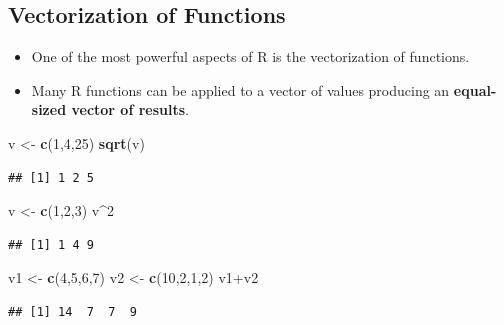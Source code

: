 \documentclass[]{book}
\newenvironment{Shaded}{\begin{snugshade}}{\end{snugshade}}
\newcommand{\KeywordTok}[1]{\textcolor[rgb]{0.13,0.29,0.53}{\textbf{{#1}}}}
\newcommand{\DecValTok}[1]{\textcolor[rgb]{0.00,0.00,0.81}{{#1}}}
\newcommand{\StringTok}[1]{\textcolor[rgb]{0.31,0.60,0.02}{{#1}}}
\newcommand{\NormalTok}[1]{{#1}}
\providecommand{\tightlist}{%
  \setlength{\itemsep}{0pt}\setlength{\parskip}{0pt}}
\begin{document}
\subsection{Vectorization of
Functions}\label{vectorization-of-functions}

\begin{itemize}
\tightlist
\item
  One of the most powerful aspects of R is the vectorization of
  functions.
\item
  Many R functions can be applied to a vector of values producing an
  \textbf{equal-sized vector of results}.
\end{itemize}

\begin{Shaded}
\begin{Highlighting}[]
\NormalTok{v <-}\StringTok{ }\KeywordTok{c}\NormalTok{(}\DecValTok{1}\NormalTok{,}\DecValTok{4}\NormalTok{,}\DecValTok{25}\NormalTok{)}
\KeywordTok{sqrt}\NormalTok{(v)}
\end{Highlighting}
\end{Shaded}

\begin{verbatim}
## [1] 1 2 5
\end{verbatim}

\begin{Shaded}
\begin{Highlighting}[]
\NormalTok{v <-}\StringTok{ }\KeywordTok{c}\NormalTok{(}\DecValTok{1}\NormalTok{,}\DecValTok{2}\NormalTok{,}\DecValTok{3}\NormalTok{)}
\NormalTok{v^}\DecValTok{2}
\end{Highlighting}
\end{Shaded}

\begin{verbatim}
## [1] 1 4 9
\end{verbatim}

\begin{Shaded}
\begin{Highlighting}[]
\NormalTok{v1 <-}\StringTok{ }\KeywordTok{c}\NormalTok{(}\DecValTok{4}\NormalTok{,}\DecValTok{5}\NormalTok{,}\DecValTok{6}\NormalTok{,}\DecValTok{7}\NormalTok{)}
\NormalTok{v2 <-}\StringTok{ }\KeywordTok{c}\NormalTok{(}\DecValTok{10}\NormalTok{,}\DecValTok{2}\NormalTok{,}\DecValTok{1}\NormalTok{,}\DecValTok{2}\NormalTok{)}
\NormalTok{v1+v2}
\end{Highlighting}
\end{Shaded}

\begin{verbatim}
## [1] 14  7  7  9
\end{verbatim}
\end{document}
